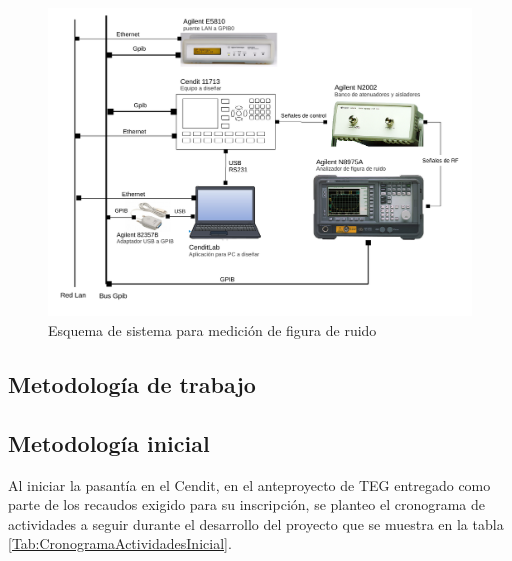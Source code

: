 \documentclass[paper=letter,oneside,fontsize=12pt, parskip=full]{article}
\begin{document}
	\begin{figure}[!h]
		\begin{center}
			\includegraphics[width=17cm]{Imagenes/DiagramaBloquesSistema.pdf}
			\caption{Esquema de sistema para medición de figura de ruido}
			\label{Fig:SistemaMediciónFiguraRuido}
		\end{center}
	\end{figure}		


	\subsection{Metodología de trabajo}
	
	\subsection{Metodología inicial}
	
	Al iniciar la pasantía en el Cendit, en el anteproyecto de TEG entregado como parte de los recaudos exigido para su inscripción, se planteo el cronograma de actividades a seguir durante el desarrollo del proyecto que se muestra en la tabla \ref{Tab:CronogramaActividadesInicial}.
	
\end{document}
